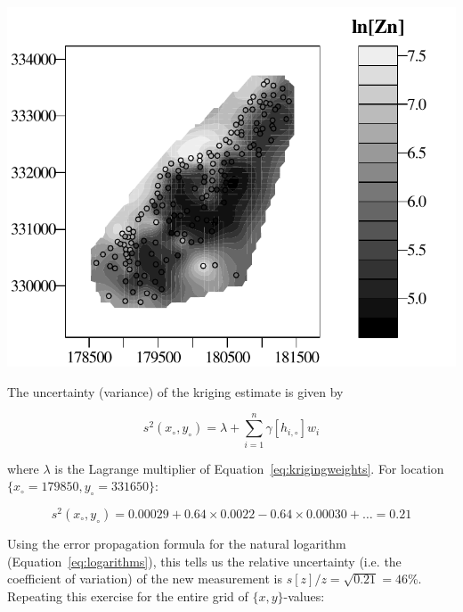 \noindent\begin{minipage}[t][][b]{.6\textwidth}
\includegraphics[width=\textwidth]{../figures/meusecontour.pdf}
\end{minipage}
\begin{minipage}[t][][t]{.39\textwidth}
  \label{fig:meusecontour}
\end{minipage}

The uncertainty (variance) of the kriging estimate is given by

\begin{equation}
  s^2(x_\circ,y_\circ) = \lambda + \sum\limits_{i=1}^n \gamma[h_{i,\circ}] w_i
  \label{eq:kriginvar}
\end{equation}

\noindent where $\lambda$ is the Lagrange multiplier of
Equation~\ref{eq:krigingweights}. For location
$\{x_\circ=179850,y_\circ=331650\}$:

\[
s^2(x_\circ,y_\circ) = 0.00029 + 0.64 \times 0.0022 - 0.64 \times
0.00030 + \ldots = 0.21
\]

Using the error propagation formula for the natural logarithm
(Equation~\ref{eq:logarithms}), this tells us the relative uncertainty
(i.e. the coefficient of variation) of the new measurement is
$s[z]/z=\sqrt{0.21}=46$\%. Repeating this exercise for the entire grid
of $\{x,y\}$-values:

